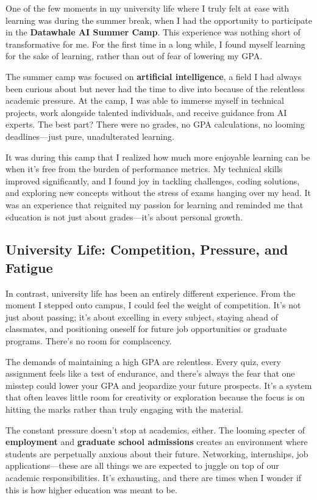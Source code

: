 \documentclass[a4paper]{article} 	%
\begin{document}
One of the few moments in my university life where I truly felt at ease with learning was during the summer break, when I had the opportunity to participate in the \textbf{Datawhale AI Summer Camp}. This experience was nothing short of transformative for me. For the first time in a long while, I found myself learning for the sake of learning, rather than out of fear of lowering my GPA.

The summer camp was focused on \textbf{artificial intelligence}, a field I had always been curious about but never had the time to dive into because of the relentless academic pressure. At the camp, I was able to immerse myself in technical projects, work alongside talented individuals, and receive guidance from AI experts. The best part? There were no grades, no GPA calculations, no looming deadlines—just pure, unadulterated learning.

It was during this camp that I realized how much more enjoyable learning can be when it’s free from the burden of performance metrics. My technical skills improved significantly, and I found joy in tackling challenges, coding solutions, and exploring new concepts without the stress of exams hanging over my head. It was an experience that reignited my passion for learning and reminded me that education is not just about grades—it’s about personal growth.

\subsection*{University Life: Competition, Pressure, and Fatigue}

In contrast, university life has been an entirely different experience. From the moment I stepped onto campus, I could feel the weight of competition. It’s not just about passing; it’s about excelling in every subject, staying ahead of classmates, and positioning oneself for future job opportunities or graduate programs. There’s no room for complacency.

The demands of maintaining a high GPA are relentless. Every quiz, every assignment feels like a test of endurance, and there’s always the fear that one misstep could lower your GPA and jeopardize your future prospects. It’s a system that often leaves little room for creativity or exploration because the focus is on hitting the marks rather than truly engaging with the material.

The constant pressure doesn’t stop at academics, either. The looming specter of \textbf{employment} and \textbf{graduate school admissions} creates an environment where students are perpetually anxious about their future. Networking, internships, job applications—these are all things we are expected to juggle on top of our academic responsibilities. It’s exhausting, and there are times when I wonder if this is how higher education was meant to be.
\end{document}
